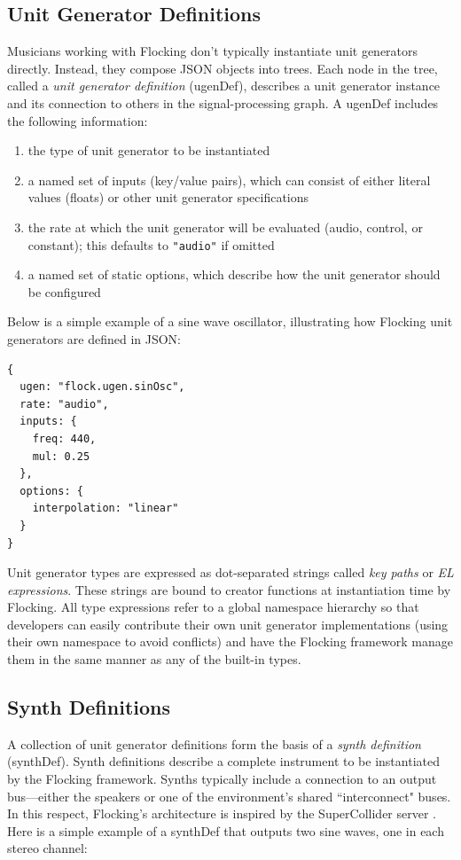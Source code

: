 \documentclass{article}
\begin{document}
\subsection{Unit Generator Definitions}

Musicians working with Flocking don't typically instantiate unit generators directly. Instead, they compose JSON objects into trees. Each node in the tree, called a {\it unit generator definition} (ugenDef), describes a unit generator instance and its connection to others in the signal-processing graph. A ugenDef includes the following information:

\begin{enumerate}
\item the type of unit generator to be instantiated
\item a named set of inputs (key/value pairs), which can consist of either literal values (floats) or other unit generator specifications
\item the rate at which the unit generator will be evaluated (audio, control, or constant); this defaults to \verb|"audio"| if omitted
\item a named set of static options, which describe how the unit generator should be configured
\end{enumerate}

Below is a simple example of a sine wave oscillator, illustrating how Flocking unit generators are defined in JSON:

\begin{verbatim}
{
  ugen: "flock.ugen.sinOsc",
  rate: "audio",
  inputs: {
    freq: 440,
    mul: 0.25
  },
  options: {
    interpolation: "linear"
  }
}
\end{verbatim}

Unit generator types are expressed as dot-separated strings called {\it key paths} or {\it EL expressions}. These strings are bound to creator functions at instantiation time by Flocking. All type expressions refer to a global namespace hierarchy so that developers can easily contribute their own unit generator implementations (using their own namespace to avoid conflicts) and have the Flocking framework manage them in the same manner as any of the built-in types.

\subsection{Synth Definitions}

A collection of unit generator definitions form the basis of a {\it synth definition} (synthDef). Synth definitions describe a complete instrument to be instantiated by the Flocking framework. Synths typically include a connection to an output bus---either the speakers or one of the environment's shared ``interconnect" buses. In this respect, Flocking's architecture is inspired by the SuperCollider server \cite[pp.25]{wilson2011supercollider}. Here is a simple example of a synthDef that outputs two sine waves, one in each stereo channel:
\end{document}
